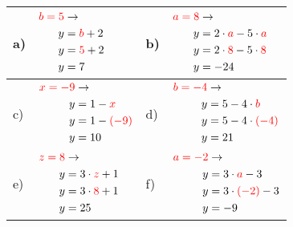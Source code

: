 \documentclass[12pt]{article}
\begin{document}
\begin{xltabular}{\textwidth}{|C{0.75cm}|X|C{0.75cm}|X|}
\hline
a)&$\begin{aligned}
\textcolor{red}{b=5} & \rightarrow\\
y&=\textcolor{red}{b} + 2\\
y&=\textcolor{red}{5} + 2\\
y&=7\\
\end{aligned}$
&
b)&$\begin{aligned}
\textcolor{red}{a=8} & \rightarrow\\
y&=2 \cdot \textcolor{red}{a} - 5 \cdot \textcolor{red}{a}\\
y&=2 \cdot \textcolor{red}{8} - 5 \cdot \textcolor{red}{8}\\
y&=-24\\
\end{aligned}$
\\\hline
c)&$\begin{aligned}
\textcolor{red}{x=-9} & \rightarrow\\
y&=1 - \textcolor{red}{x}\\
y&=1 - \textcolor{red}{(-9)}\\
y&=10\\
\end{aligned}$
&
d)&$\begin{aligned}
\textcolor{red}{b=-4} & \rightarrow\\
y&=5 - 4 \cdot \textcolor{red}{b}\\
y&=5 - 4 \cdot \textcolor{red}{(-4)}\\
y&=21\\
\end{aligned}$
\\\hline
e)&$\begin{aligned}
\textcolor{red}{z=8} & \rightarrow\\
y&=3 \cdot \textcolor{red}{z} + 1\\
y&=3 \cdot \textcolor{red}{8} + 1\\
y&=25\\
\end{aligned}$
&
f)&$\begin{aligned}
\textcolor{red}{a=-2} & \rightarrow\\
y&=3 \cdot \textcolor{red}{a} - 3\\
y&=3 \cdot \textcolor{red}{(-2)} - 3\\
y&=-9\\
\end{aligned}$

\end{xltabular}
\end{document}

